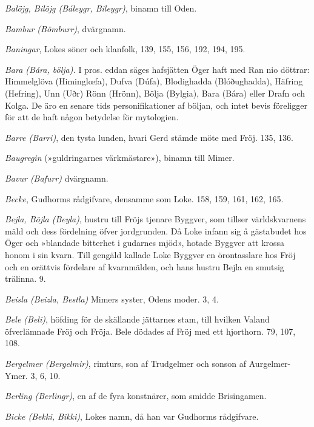 \emph{Balöjg, Bilöjg (Báleygr, Bileygr)}, binamn till Oden.

\emph{Bambur (Bömburr)}, dvärgnamn.

\emph{Baningar}, Lokes söner och klanfolk, 139, 155, 156, 192, 194, 195.

\emph{Bara (Bára, bölja).} I pros. eddan säges hafsjätten Öger haft med
Ran nio döttrar: Himmelglöva (Himinglœfa), Dufva (Dúfa), Blodighadda
(Blóðughadda), Häfring (Hefring), Unn (Uðr) Rönn (Hrönn), Bölja
(Bylgia), Bara (Bára) eller Drafn och Kolga. De äro en senare tids
personifikationer af böljan, och intet bevis föreligger för att de haft
någon betydelse för mytologien.

\emph{Barre (Barri)}, den tysta lunden, hvari Gerd stämde möte med Fröj.
135, 136.

\protect\hypertarget{lb1625905.xhtmlux5cux23start208}{}{}\protect\hypertarget{lb1625905.xhtmlux5cux23start208-a}{}{}\protect\hypertarget{lb1625905.xhtmlux5cux23start208-b}{}{}\protect\hypertarget{lb1625905.xhtmlux5cux23start208-c}{}{}\protect\hypertarget{lb1625905.xhtmlux5cux23start208-d}{}{}

\emph{Baugregin} (»guldringarnes värkmästare»), binamn till Mimer.

\emph{Bavur (Bafurr)} dvärgnamn.

\emph{Becke}, Gudhorms rådgifvare, densamme som Loke. 158, 159, 161,
162, 165.

\emph{Bejla, Böjla (Beyla)}, hustru till Fröjs tjenare Byggver, som
tillser världskvarnens mäld och dess fördelning öfver jordgrunden. Då
Loke infann sig å gästabudet hos Öger och »blandade bitterhet i gudarnes
mjöd», hotade Byggver att krossa honom i sin kvarn. Till gengäld kallade
Loke Byggver en örontasslare hos Fröj och en orättvis fördelare af
kvarnmälden, och hans hustru Bejla en smutsig trälinna. 9.

\emph{Beisla (Beizla, Bestla)} Mimers syster, Odens moder. 3, 4.

\emph{Bele (Beli)}, höfding för de skällande jättarnes stam, till
hvilken Valand öfverlämnade Fröj och Fröja. Bele dödades af Fröj med ett
hjorthorn. 79, 107, 108.

\emph{Bergelmer (Bergelmir)}, rimturs, son af Trudgelmer och sonson af
Aurgelmer-Ymer. 3, 6, 10.

\emph{Berling (Berlingr)}, en af de fyra konstnärer, som smidde
Brisingamen.

\emph{Bicke (Bekki, Bikki)}, Lokes namn, då han var Gudhorms rådgifvare.

